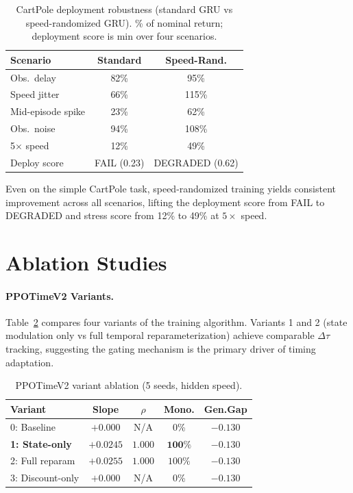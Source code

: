 \documentclass[10pt,twocolumn]{article}
\newcommand{\deltatau}{\Delta\tau}
\theoremstyle{plain}
\theoremstyle{definition}
\begin{document}
\begin{table}[h]
\centering
\caption{CartPole deployment robustness (standard GRU vs speed-randomized GRU).
\% of nominal return; deployment score is min over four scenarios.}
\label{tab:cartpole}
\small
\begin{tabular}{lcc}
\toprule
Scenario & Standard & Speed-Rand. \\
\midrule
Obs.\ delay & 82\% & 95\% \\
Speed jitter & 66\% & 115\% \\
Mid-episode spike & 23\% & 62\% \\
Obs.\ noise & 94\% & 108\% \\
5$\times$ speed & 12\% & 49\% \\
\midrule
Deploy score & FAIL (0.23) & DEGRADED (0.62) \\
\bottomrule
\end{tabular}
\vspace{-0.5em}
\end{table}

Even on the simple CartPole task, speed-randomized training yields consistent
improvement across all scenarios, lifting the deployment score from FAIL to DEGRADED
and stress score from 12\% to 49\% at $5\times$ speed.

\section{Ablation Studies}
\label{sec:ablation}

\paragraph{PPOTimeV2 Variants.}
Table~\ref{tab:ablation} compares four variants of the training algorithm.
Variants 1 and 2 (state modulation only vs full temporal reparameterization)
achieve comparable $\deltatau$ tracking, suggesting the gating mechanism is
the primary driver of timing adaptation.

\begin{table}[h]
\centering
\caption{PPOTimeV2 variant ablation (5 seeds, hidden speed).}
\label{tab:ablation}
\small
\begin{tabular}{lcccc}
\toprule
Variant & Slope & $\rho$ & Mono. & Gen.Gap \\
\midrule
0: Baseline & $+0.000$ & N/A & 0\% & $-0.130$ \\
\textbf{1: State-only} & $\mathbf{+0.0245}$ & $\mathbf{1.000}$ & $\mathbf{100\%}$ & $-0.130$ \\
2: Full reparam & $+0.0255$ & $1.000$ & $100\%$ & $-0.130$ \\
3: Discount-only & $+0.000$ & N/A & 0\% & $-0.130$ \\
\bottomrule
\end{tabular}
\vspace{-0.5em}
\end{table}
\end{document}
